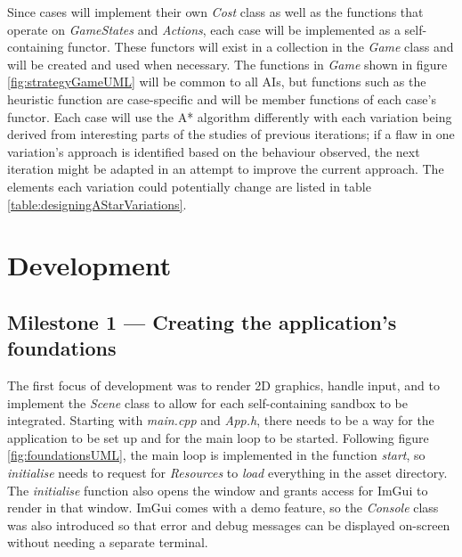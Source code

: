 \documentclass[11pt, a4paper]{report}
\begin{document}
Since cases will implement their own \emph{Cost} class as well as the functions that operate on \emph{GameStates} and \emph{Actions}, each case will be implemented as a self-containing functor. These functors will exist in a collection in the \emph{Game} class and will be created and used when necessary. The functions in \emph{Game} shown in figure \ref{fig:strategyGameUML} will be common to all AIs, but functions such as the heuristic function are case-specific and will be member functions of each case's functor. Each case will use the A* algorithm differently with each variation being derived from interesting parts of the studies of previous iterations; if a flaw in one variation's approach is identified based on the behaviour observed, the next iteration might be adapted in an attempt to improve the current approach. The elements each variation could potentially change are listed in table \ref{table:designingAStarVariations}.  

\section{Development}
\label{sec:development}

\subsection[Creating the application's foundations]{Milestone 1 --- Creating the application's foundations}
\label{subsec:creatingTheFoundations}

The first focus of development was to render 2D graphics, handle input, and to implement the \emph{Scene} class to allow for each self-containing sandbox to be integrated. Starting with \emph{main.cpp} and \emph{App.h}, there needs to be a way for the application to be set up and for the main loop to be started. Following figure \ref{fig:foundationsUML}, the main loop is implemented in the function \emph{start}, so \emph{initialise} needs to request for \emph{Resources} to \emph{load} everything in the asset directory. The \emph{initialise} function also opens the window and grants access for ImGui to render in that window. ImGui comes with a demo feature, so the \emph{Console} class was also introduced so that error and debug messages can be displayed on-screen without needing a separate terminal.
\end{document}
